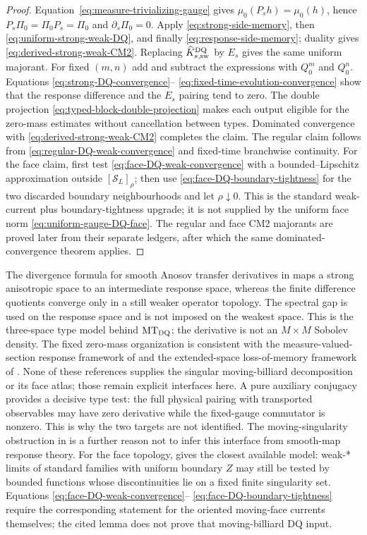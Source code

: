 \documentclass[11pt]{article}
\begin{document}
\begin{proof}
Equation~\eqref{eq:measure-trivializing-gauge} gives
$\mu_0(P_sh)=\mu_0(h)$, hence $P_s\Pi_0=\Pi_0P_s=\Pi_0$ and
$\partial_s\Pi_0=0$.  Apply \eqref{eq:strong-side-memory}, then
\eqref{eq:uniform-strong-weak-DQ}, and finally
\eqref{eq:response-side-memory}; duality gives
\eqref{eq:derived-strong-weak-CM2}.  Replacing
$\widehat K_{s,\rm sw}^{\rm DQ}$ by $E_s$ gives the same uniform majorant.
For fixed $(m,n)$ add and subtract the expressions with $Q_0^m$ and $Q_0^n$.
Equations \eqref{eq:strong-DQ-convergence}--
\eqref{eq:fixed-time-evolution-convergence} show that the response difference
and the $E_s$ pairing tend to zero.  The double projection
\eqref{eq:typed-block-double-projection} makes each output eligible for the
zero-mass estimates without cancellation between types.  Dominated
convergence with \eqref{eq:derived-strong-weak-CM2} completes the claim.  The
regular claim follows from
\eqref{eq:regular-DQ-weak-convergence} and fixed-time branchwise continuity.
For the face claim, first test
\eqref{eq:face-DQ-weak-convergence} with a bounded--Lipschitz approximation
outside $[\mathcal S_L]_\rho$; then use
\eqref{eq:face-DQ-boundary-tightness} for the two discarded boundary
neighbourhoods and let $\rho\downarrow0$.  This is the standard
weak-current plus boundary-tightness upgrade; it is not supplied by the
uniform face norm \eqref{eq:uniform-gauge-DQ-face}.  The regular and face
CM2 majorants are proved later from their separate ledgers, after which the
same dominated-convergence theorem applies.
\end{proof}

The divergence formula for smooth Anosov transfer derivatives in
\cite{FroylandPhalempin} maps a strong anisotropic space to an intermediate
response space, whereas the finite difference quotients converge only in a
still weaker operator topology.  The spectral gap is used on the response
space and is not imposed on the weakest space.  This is the three-space type
model behind $\mathrm{MT}_{\rm DQ}$; the derivative is not an $M\times M$
Sobolev density.  The fixed zero-mass organization is
consistent with the measure-valued-section response framework of
\cite{AlvesBahsoun} and the extended-space loss-of-memory framework of
\cite{GalatoloLucarini}.  None of these references supplies the singular
moving-billiard decomposition or its face atlas; those remain explicit
interfaces here.  A pure auxiliary conjugacy provides a decisive type test:
the full physical pairing with transported observables may have zero
derivative while the fixed-gauge commutator is nonzero.  This is why the two
targets are not identified.
The moving-singularity obstruction in \cite{BahsounGalatolo} is a further
reason not to infer this interface from smooth-map response theory.
For the face topology, \cite[Lemma~5.4]{CanestrariHoles} gives the closest
available model: weak-* limits of standard families with uniform boundary
$Z$ may still be tested by bounded functions whose discontinuities lie on a
fixed finite singularity set.  Equations
\eqref{eq:face-DQ-weak-convergence}--
\eqref{eq:face-DQ-boundary-tightness} require the corresponding statement for
the oriented moving-face currents themselves; the cited lemma does not prove
that moving-billiard DQ input.
\end{document}
